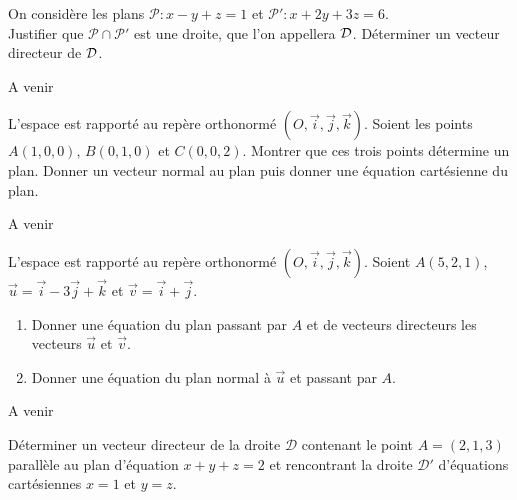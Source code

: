 \documentclass[a4paper, 11pt]{article}
\begin{document}
\begin{exercice}  \;
	On consid\`ere les plans $\mathcal{P} : x-y+z=1$ et $\mathcal{P}' : x + 2y +3z =6$. \\
	Justifier que $\mathcal{P}\cap \mathcal{P}'$ est une droite, que l'on appellera $\cal D$. D\'eterminer un vecteur directeur de $\cal D$.
\end{exercice}
\begin{correction}
	A venir
\end{correction}




\begin{exercice}
	L'espace est rapport\'e au rep\`ere orthonorm\'e $(O,\vec{i},\vec{j},\vec{k})$. Soient les points $A(1,0,0)$, $B(0,1,0)$ et $C(0,0,2)$. Montrer que ces trois points d\'etermine un plan. Donner un vecteur normal au plan puis donner une \'equation cart\'esienne du plan.
\end{exercice}

\begin{correction}
	A venir
\end{correction}




\begin{exercice}
	L'espace est rapport\'e au rep\`ere orthonorm\'e $(O,\vec{i},\vec{j},\vec{k})$. Soient $A(5,2,1)$, $\vec{u}=\vec{i}-3\vec{j}+\vec{k}$ et $\vec{v}=\vec{i}+\vec{j}$.
	\begin{enumerate}
		\item Donner une \'equation du plan passant par $A$ et de vecteurs directeurs les vecteurs $\vec{u}$ et $\vec{v}$.
		\item Donner une \'equation du plan normal \`a $\vec{u}$ et passant par $A$.
	\end{enumerate}
\end{exercice}

\begin{correction}
	A venir
\end{correction}



\begin{exercice}  \;
	D\'eterminer un vecteur directeur de la  droite $\mathcal{D}$ contenant le point $A=(2,1,3)$ parall\`ele au plan d'\'equation $x+y+z=2$ et rencontrant la droite $\mathcal{D}'$ d'\'equations cart\'esiennes $x=1$ et $y=z$.
\end{exercice}
\end{document}
